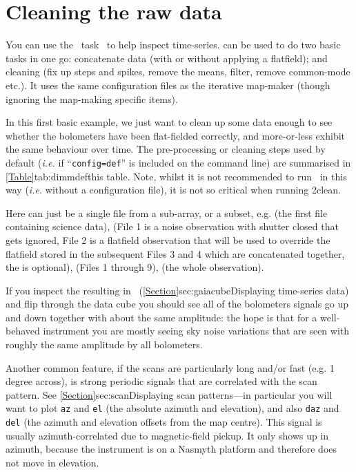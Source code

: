 \chapter{Cleaning the raw data}
\label{app:clean}

You can use the \smurf\ task \clean\ to help inspect time-series.
 can be used to do two basic tasks in one go:
concatenate data (with or without applying a flatfield); and cleaning
(fix up steps and spikes, remove the means, filter, remove common-mode
etc.). It uses the same configuration files as the iterative map-maker
(though ignoring the map-making specific items).

In this first basic example, we just want to clean up some data enough
to see whether the bolometers have been flat-fielded correctly, and
more-or-less exhibit the same behaviour over time. The pre-processing
or cleaning steps used by default (\emph{i.e.} if ``\texttt{config=def}''
is included on the command line) are summarised in \cref{Table}{tab:dimmdef}{this
table}. Note, whilst it is not recommended to run \makemap\ in this way
(\emph{i.e.} without a configuration file), it is not so critical when running
\sc2clean.

\begin{terminalv}
\end{terminalv}

Here  can just be a single file from a sub-array, or a
subset, e.g.  (the first file
containing science data),  (File
1 is a noise observation with shutter closed that gets ignored, File 2
is a flatfield observation that will be used to override the flatfield
stored in the subsequent Files 3 and 4 which are concatenated
together, the  is optional),
 (Files 1 through 9),
 (the whole observation).

If you inspect the resulting  in \gaia\
(\cref{Section}{sec:gaiacube}{Displaying time-series data}) and flip
through the data cube you should see all of the bolometers signals go
up and down together with about the same amplitude: the hope is that
for a well-behaved instrument you are mostly seeing sky noise
variations that are seen with roughly the same amplitude by all
bolometers.

Another common feature, if the scans are particularly long and/or fast
(e.g. 1\,degree across), is strong periodic signals that are
correlated with the scan pattern. See
\cref{Section}{sec:scan}{Displaying scan patterns}---in particular you
will want to plot \texttt{az} and \texttt{el} (the absolute azimuth
and elevation), and also \texttt{daz} and \texttt{del} (the azimuth
and elevation offsets from the map centre). This signal is usually
azimuth-correlated due to magnetic-field pickup. It only shows up in
azimuth, because the instrument is on a Nasmyth platform and therefore
does not move in elevation.

